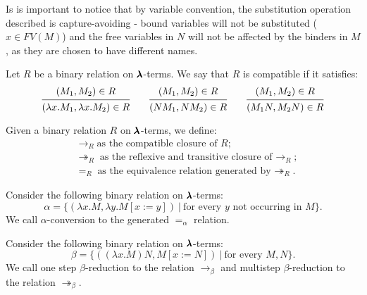 \begin{remark}
  Is is important to notice that by variable convention, the substitution operation described is capture-avoiding
  - bound variables will not be substituted ($x \in FV(M)$) and the free variables in $N$ will not be affected by the binders in $M$, as they are chosen to have different names. 
\end{remark}

\begin{definition}
  Let $R$ be a binary relation on $\pmb{\lambda}$-terms.
  We say that $R$ is compatible if it satisfies:
  \[
    \begin{prooftree}
      \hypo{ (M_1, M_2) \in R }
      \infer1{ (\lambda x . M_1, \lambda x . M_2) \in R } 
    \end{prooftree}
    \qquad
    \begin{prooftree}
      \hypo{ (M_1, M_2) \in R }
      \infer1{ (N M_1, N M_2) \in R } 
    \end{prooftree}
    \qquad
    \begin{prooftree}
      \hypo{ (M_1, M_2) \in R }
      \infer1{ (M_1 N, M_2 N) \in R }
    \end{prooftree}
  \]
\end{definition}


\begin{notation}
  Given a binary relation $R$ on $\pmb{\lambda}$-terms, we define:
  \begin{align*}
    & \to_R \text{as the compatible closure of $R$} ; \\
    & \twoheadrightarrow_R \text{as the reflexive and transitive closure of $\to_R$} ; \\
    & =_R \text{as the equivalence relation generated by $\twoheadrightarrow_R$}.
  \end{align*}
\end{notation}


\begin{definition}
  Consider the following binary relation on $\pmb{\lambda}$-terms:  
  \[
    \alpha = \{ (\lambda x . M, \lambda y . M[x := y]) \
                | \ \text{for every $y$ not occurring in $M$} \}.
  \]  
  We call $\alpha$-conversion to the generated $=_\alpha$ relation.
\end{definition}


\begin{definition}
  Consider the following binary relation on $\pmb{\lambda}$-terms:  
  \[
    \beta = \{ ((\lambda x . M) N, M[x := N]) \
                | \ \text{for every $M, N$} \}.
  \]  
  We call one step $\beta$-reduction to the relation $\to_\beta$ and multistep $\beta$-reduction to the relation $\twoheadrightarrow_\beta$.
\end{definition}


